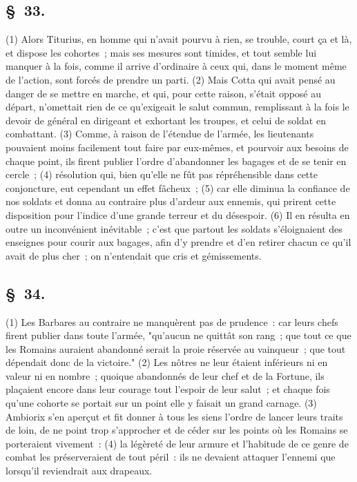 \documentclass[french,twoside]{book} %
\begin{document}
\subsection[{§ 33.}]{ \textsc{§ 33.} }
\noindent (1) Alors Titurius, en homme qui n’avait pourvu à rien, se trouble, court ça et là, et dispose les cohortes ; mais ses mesures sont timides, et tout semble lui manquer à la fois, comme il arrive d’ordinaire à ceux qui, dans le moment même de l’action, sont forcés de prendre un parti. (2) Mais Cotta qui avait pensé au danger de se mettre en marche, et qui, pour cette raison, s’était opposé au départ, n’omettait rien de ce qu’exigeait le salut commun, remplissant à la fois le devoir de général en dirigeant et exhortant les troupes, et celui de soldat en combattant. (3) Comme, à raison de l’étendue de l’armée, les lieutenants pouvaient moins facilement tout faire par eux-mêmes, et pourvoir aux besoins de chaque point, ils firent publier l’ordre d’abandonner les bagages et de se tenir en cercle ; (4) résolution qui, bien qu’elle ne fût pas répréhensible dans cette conjoncture, eut cependant un effet fâcheux ; (5) car elle diminua la confiance de nos soldats et donna au contraire plus d’ardeur aux ennemis, qui prirent cette disposition pour l’indice d’une grande terreur et du désespoir. (6) Il en résulta en outre un inconvénient inévitable ; c’est que partout les soldats s’éloignaient des enseignes pour courir aux bagages, afin d’y prendre et d’en retirer chacun ce qu’il avait de plus cher ; on n’entendait que cris et gémissements.
\subsection[{§ 34.}]{ \textsc{§ 34.} }
\noindent (1) Les Barbares au contraire ne manquèrent pas de prudence : car leurs chefs firent publier dans toute l’armée, "qu’aucun ne quittât son rang ; que tout ce que les Romains auraient abandonné serait la proie réservée au vainqueur ; que tout dépendait donc de la victoire." (2) Les nôtres ne leur étaient inférieurs ni en valeur ni en nombre ; quoique abandonnés de leur chef et de la Fortune, ils plaçaient encore dans leur courage tout l’espoir de leur salut ; et chaque fois qu’une cohorte se portait sur un point elle y faisait un grand carnage. (3) Ambiorix s’en aperçut et fit donner à tous les siens l’ordre de lancer leurs traits de loin, de ne point trop s’approcher et de céder sur les points où les Romains se porteraient vivement : (4) la légèreté de leur armure et l’habitude de ce genre de combat les préserveraient de tout péril : ils ne devaient attaquer l’ennemi que lorsqu’il reviendrait aux drapeaux.
\end{document}
